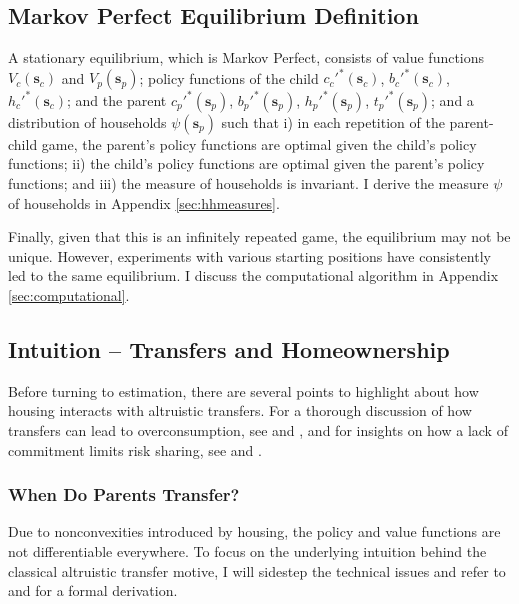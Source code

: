\documentclass[12pt]{article}
\begin{document}
\subsection{Markov Perfect Equilibrium Definition}
A stationary equilibrium, which is Markov Perfect, consists of value functions $V_c(\mathbf{s}_c)$ and $V_p(\mathbf{s}_p)$; policy functions of the child $c_c'^*(\mathbf{s}_c)$, $b_c'^*(\mathbf{s}_c)$, $h_c'^*(\mathbf{s}_c)$; and the parent $c_p'^*(\mathbf{s}_p)$, $b_p'^*(\mathbf{s}_p)$, $h_p'^*(\mathbf{s}_p)$, $t_p'^*(\mathbf{s}_p)$; and a distribution of households $\psi(\mathbf{s}_p)$ such that i) in each repetition of the parent-child game, the parent's policy functions are optimal given the child's policy functions; ii) the child's policy functions are optimal given the parent's policy functions; and iii) the measure of households is invariant. I derive the measure $\psi$ of households in Appendix \ref{sec:hhmeasures}.

Finally, given that this is an infinitely repeated game, the equilibrium may not be unique. However, experiments with various starting positions have consistently led to the same equilibrium. I discuss the computational algorithm in Appendix \ref{sec:computational}.


\subsection{Intuition -- Transfers and Homeownership}\label{sec:modelintuition}
Before turning to estimation, there are several points to highlight about how housing interacts with altruistic transfers. For a thorough discussion of how transfers can lead to overconsumption, see \cite{Altonji1997a} and \cite{Barczyk2014}, and for insights on how a lack of commitment limits risk sharing, see \cite{Attanasio2018} and \cite{Mommaerts2016}. 

\subsubsection{When Do Parents Transfer?}
Due to nonconvexities introduced by housing, the policy and value functions are not differentiable everywhere. To focus on the underlying intuition behind the classical altruistic transfer motive, I will sidestep the technical issues and refer to \cite{Barczyk2020} and \cite{Chu2020} for a formal derivation.
\end{document}
